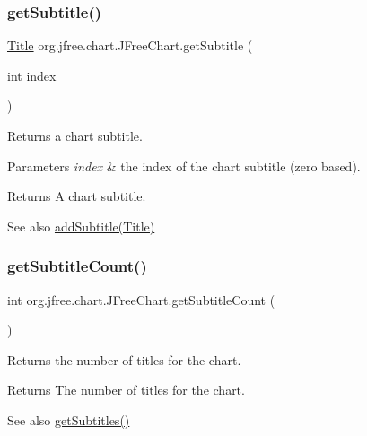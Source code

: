 \subsubsection{\texorpdfstring{get\+Subtitle()}{getSubtitle()}}
{\footnotesize\ttfamily \mbox{\hyperlink{classorg_1_1jfree_1_1chart_1_1title_1_1_title}{Title}} org.\+jfree.\+chart.\+J\+Free\+Chart.\+get\+Subtitle (\begin{DoxyParamCaption}\item[{int}]{index }\end{DoxyParamCaption})}

Returns a chart subtitle.


\begin{DoxyParams}{Parameters}
{\em index} & the index of the chart subtitle (zero based).\\
\hline
\end{DoxyParams}
\begin{DoxyReturn}{Returns}
A chart subtitle.
\end{DoxyReturn}
\begin{DoxySeeAlso}{See also}
\mbox{\hyperlink{classorg_1_1jfree_1_1chart_1_1_j_free_chart_a511d69d8b64444f31c59761a1c7ba8f8}{add\+Subtitle(\+Title)}} 
\end{DoxySeeAlso}
\mbox{\label{classorg_1_1jfree_1_1chart_1_1_j_free_chart_aea3529a3eb5a3c86a1bf60238bbbfd41}} 
\subsubsection{\texorpdfstring{get\+Subtitle\+Count()}{getSubtitleCount()}}
{\footnotesize\ttfamily int org.\+jfree.\+chart.\+J\+Free\+Chart.\+get\+Subtitle\+Count (\begin{DoxyParamCaption}{ }\end{DoxyParamCaption})}

Returns the number of titles for the chart.

\begin{DoxyReturn}{Returns}
The number of titles for the chart.
\end{DoxyReturn}
\begin{DoxySeeAlso}{See also}
\mbox{\hyperlink{classorg_1_1jfree_1_1chart_1_1_j_free_chart_ae2ec05a9cb012173d7982409ee9b8c6b}{get\+Subtitles()}} 
\end{DoxySeeAlso}
\mbox{\label{classorg_1_1jfree_1_1chart_1_1_j_free_chart_ae2ec05a9cb012173d7982409ee9b8c6b}} 
